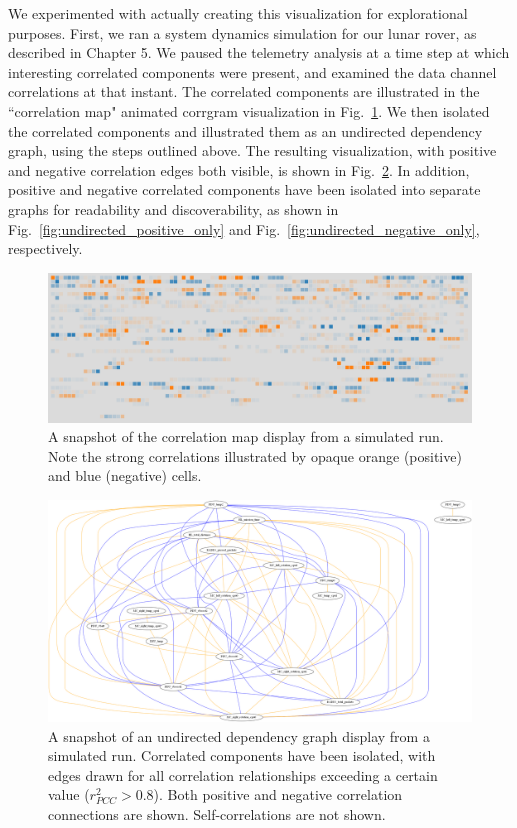 We experimented with actually creating this visualization for explorational purposes. First, we ran a system dynamics simulation for our lunar rover, as described in Chapter 5. We paused the telemetry analysis at a time step at which interesting correlated components were present, and examined the data channel correlations at that instant. The correlated components are illustrated in the ``correlation map" animated corrgram visualization in Fig.~\ref{fig:comparison_correlation_map}. We then isolated the correlated components and illustrated them as an undirected dependency graph, using the steps outlined above. The resulting visualization, with positive and negative correlation edges both visible, is shown in Fig.~\ref{fig:undirected_both}. In addition, positive and negative correlated components have been isolated into separate graphs for readability and discoverability, as shown in Fig.~\ref{fig:undirected_positive_only} and Fig.~\ref{fig:undirected_negative_only}, respectively.

\begin{figure}[h]
\centering
    \includegraphics[width=\columnwidth]{images/comparison_correlation_map.png}
    \caption{A snapshot of the correlation map display from a simulated run. Note the strong correlations illustrated by opaque orange (positive) and blue (negative) cells.}
    \label{fig:comparison_correlation_map}
\end{figure}

\begin{figure}[h]
\centering
    \includegraphics[width=\columnwidth]{images/undirected_both.png}
    \caption{A snapshot of an undirected dependency graph display from a simulated run. Correlated components have been isolated, with edges drawn for all correlation relationships exceeding a certain value ($r_{PCC}^{2} > 0.8$). Both positive and negative correlation connections are shown. Self-correlations are not shown.}
    \label{fig:undirected_both}
\end{figure}

